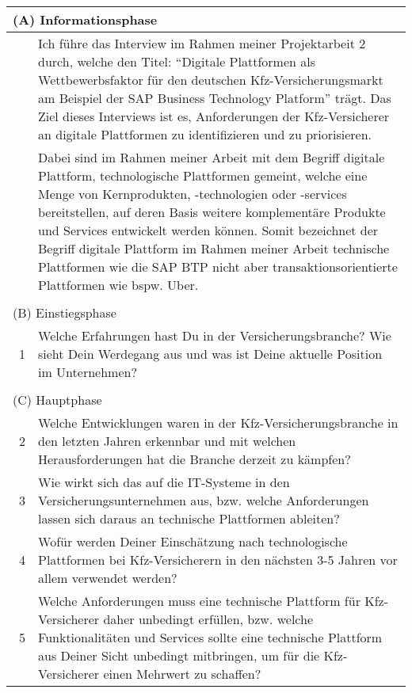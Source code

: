 \begin{table}[H]
\begin{tabularx}{\linewidth}{lX}
\multicolumn{2}{l}{(A) Informationsphase} \\\hline \hline 
    \    & Ich führe das Interview im Rahmen meiner Projektarbeit 2 durch, welche den Titel: \enquote{Digitale Plattformen als Wettbewerbsfaktor für den deutschen Kfz-Versicherungsmarkt am Beispiel der SAP Business Technology Platform} trägt. Das Ziel dieses Interviews ist es, Anforderungen der Kfz-Versicherer an digitale Plattformen zu identifizieren und zu priorisieren. \\\hline
    \    & Dabei sind im Rahmen meiner Arbeit mit dem Begriff digitale Plattform, technologische Plattformen gemeint, welche eine Menge von Kernprodukten, -technologien oder -services bereitstellen, auf deren Basis weitere komplementäre Produkte und Services entwickelt werden können. Somit bezeichnet der Begriff digitale Plattform im Rahmen meiner Arbeit technische Plattformen wie die SAP BTP nicht aber transaktionsorientierte Plattformen wie bspw. Uber.\\\hline
    \\     
\multicolumn{2}{l}{(B) Einstiegsphase}  \\\hline \hline
    \  1 & Welche Erfahrungen hast Du in der Versicherungsbranche? Wie sieht Dein Werdegang aus und was ist Deine aktuelle Position im Unternehmen? \\\hline     
    \\  
\multicolumn{2}{l}{(C) Hauptphase}  \\\hline \hline
    \  2 & Welche Entwicklungen waren in der Kfz-Versicherungsbranche in den letzten Jahren erkennbar und mit welchen Herausforderungen hat die Branche derzeit zu kämpfen?  \\\hline
    \  3 & Wie wirkt sich das auf die IT-Systeme in den Versicherungsunternehmen aus, bzw. welche Anforderungen lassen sich daraus an technische Plattformen ableiten? \\\hline
    \  4 & Wofür werden Deiner Einschätzung nach technologische Plattformen bei Kfz-Versicherern in den nächsten 3-5 Jahren vor allem verwendet werden? \\\hline
    \  5 & Welche Anforderungen muss eine technische Plattform für Kfz-Versicherer daher unbedingt erfüllen, bzw. welche Funktionalitäten und Services sollte eine technische Plattform aus Deiner Sicht unbedingt mitbringen, um für die Kfz-Versicherer einen Mehrwert zu schaffen?  \\\hline
    
    \end{tabularx}
    \end{table} 
    \newpage


